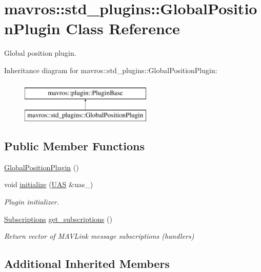 \hypertarget{classmavros_1_1std__plugins_1_1GlobalPositionPlugin}{}\section{mavros\+::std\+\_\+plugins\+::Global\+Position\+Plugin Class Reference}
\label{classmavros_1_1std__plugins_1_1GlobalPositionPlugin}


Global position plugin.  


Inheritance diagram for mavros\+::std\+\_\+plugins\+::Global\+Position\+Plugin\+:\begin{figure}[H]
\begin{center}
\leavevmode
\includegraphics[height=2.000000cm]{classmavros_1_1std__plugins_1_1GlobalPositionPlugin}
\end{center}
\end{figure}
\subsection*{Public Member Functions}
\begin{DoxyCompactItemize}
\item 
\mbox{\hyperlink{group__plugin_ga0f7a01f0082226ac8f883f5ce9b53b3d}{Global\+Position\+Plugin}} ()
\item 
void \mbox{\hyperlink{group__plugin_ga41dceb095bbd1b8b99c46c9a277bb7a9}{initialize}} (\mbox{\hyperlink{classmavros_1_1UAS}{U\+AS}} \&uas\+\_\+)
\begin{DoxyCompactList}\small\item\em Plugin initializer. \end{DoxyCompactList}\item 
\mbox{\hyperlink{group__plugin_ga8967d61fc77040e0c3ea5a4585d62a09}{Subscriptions}} \mbox{\hyperlink{group__plugin_ga0dfa5c046201515b43ef6e843b74c89a}{get\+\_\+subscriptions}} ()
\begin{DoxyCompactList}\small\item\em Return vector of M\+A\+V\+Link message subscriptions (handlers) \end{DoxyCompactList}\end{DoxyCompactItemize}
\subsection*{Additional Inherited Members}


